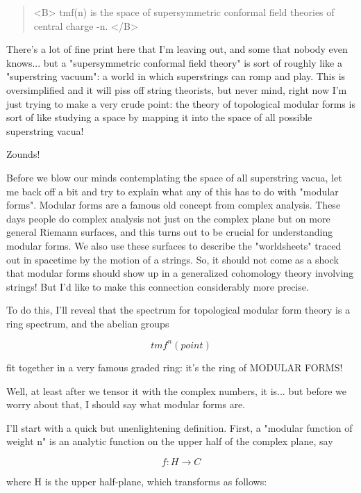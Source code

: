\begin{quote}<B>
  tmf(n) is the space of supersymmetric conformal field theories 
                   of central charge -n.
</B>\end{quote}
There's a lot of fine print here that I'm leaving out, and some 
that nobody even knows... but a "supersymmetric conformal field 
theory" is sort of roughly like a "superstring vacuum": a world
in which superstrings can romp and play.  This is oversimplified
and it will piss off string theorists, but never mind, right now 
I'm just trying to make a very crude point: the theory of 
topological modular forms is sort of like studying a space by 
mapping it into the space of all possible superstring vacua!

Zounds!

Before we blow our minds contemplating the space of all superstring
vacua, let me back off a bit and try to explain what any of this 
has to do with "modular forms".  Modular forms are a famous old 
concept 
from complex analysis.  These days people do complex analysis not just 
on the complex plane but on more general Riemann surfaces, and this 
turns out to be crucial for understanding modular forms.  We also use 
these surfaces to describe the "worldsheets" traced out in spacetime 
by the motion of a strings.  So, it should not come as a shock that 
modular forms should show up in a generalized cohomology theory involving 
strings!  But I'd like to make this connection considerably more precise.
  
To do this, I'll reveal that the spectrum for topological modular 
form theory is a ring spectrum, and the abelian groups


$$

tmf^{n}(point) 
$$
    
fit together in a very famous graded ring: it's the ring of 
MODULAR FORMS!  

Well, at least after we tensor it with the complex numbers,
it is... but before we worry about that, I should say what 
modular forms are.

I'll start with a quick but unenlightening definition.
First, a "modular function of weight n" is an analytic 
function on the upper half of the complex plane, say


$$

f: H \to  C                      
$$
    
where H is the upper half-plane, which transforms as follows:


$$

